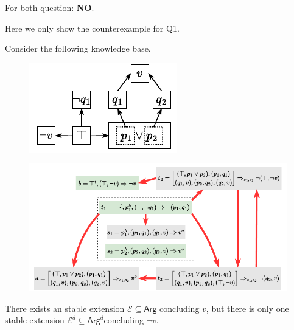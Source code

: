 \documentclass[aspectratio=169]{beamer}
\begin{document}
\begin{frame}
	For both question: \textbf{NO}.
	
	Here we only show the counterexample for Q1.
	
	Consider the following knowledge base.
	
	\begin{figure}[!h]
		\centering
		\includegraphics[scale=1.2]{pic/example1.pdf}
	\end{figure}
\end{frame}

\begin{frame}
	\begin{figure}[!h]
		\centering
		\includegraphics[scale=0.87]{pic/example1_argument.pdf}
	\end{figure}
	
	There exists an stable extension $\mathscr{E}\subseteq\mathsf{Arg}$ concluding $v$, but there is only one stable extension $\mathscr{E}^d\subseteq\mathsf{Arg}^d$concluding $\neg v$.
\end{frame}
\end{document}
